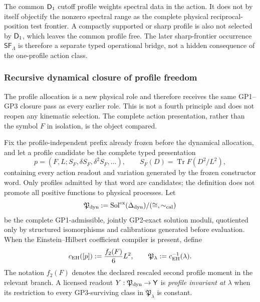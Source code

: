 \documentclass[12pt,a4paper]{article}
\begin{document}
\begin{remark}
\label{p3:rem:action-profile-resolution-frontier}
The common \(\mathsf{D}_1\) cutoff profile weights spectral data in the action.  It
does not by itself objectify the nonzero spectral range as the complete
physical reciprocal-position test frontier.  A compactly supported or sharp
profile is also not selected by \(\mathsf{D}_1\), which leaves the common profile
free.  The later sharp-frontier occurrence \(\mathsf{SF}_\Lambda\) is
therefore a separate typed operational bridge, not a hidden consequence of
the one-profile action class.
\end{remark}

\subsubsection{Recursive dynamical closure of profile freedom}
\label{p3b:sec:dynamical-profile-invariance}

The profile allocation is a new physical role and therefore receives the same
GP1--GP3 closure pass as every earlier role.  This is not a fourth principle
and does not reopen any kinematic selection.  The complete action presentation,
rather than the symbol \(F\) in isolation, is the object compared.

\begin{definition}
\label{p3b:def:exact-dynamical-profile-moduli}
Fix the profile-independent prefix already frozen before the dynamical
allocation, and let a profile candidate be the complete typed presentation
\[
 p=(F,L;S_F,\delta S_F,\delta^2S_F,\ldots),
 \qquad
 S_F(D)=\operatorname{Tr}F(D^2/L^2),
\]
containing every action readout and variation generated by the frozen
constructor word.  Only profiles admitted by that word are candidates; the
definition does not promote all positive functions to physical processes.
Let
\[
 \mathfrak P_{\rm dyn}
 :=\operatorname{Sol}^{\rm ex}(\Delta_{\rm dyn})/
   (\cong,\sim_{\rm cal})
\]
be the complete GP1-admissible, jointly GP2-exact solution moduli, quotiented
only by structured isomorphisms and calibrations generated before evaluation.
When the Einstein--Hilbert coefficient compiler is present, define
\[
 c_{\rm EH}([p])
 :=\frac{f_2(F)}6L^2,
 \qquad
 \mathfrak P_\lambda:=c_{\rm EH}^{-1}(\lambda).
\]
The notation \(f_2(F)\) denotes the declared rescaled second profile moment in
the relevant branch.  A licensed readout
\(Y:\mathfrak P_{\rm dyn}\to\mathsf Y\) is
\emph{profile invariant at \(\lambda\)} when its restriction to every
GP3-surviving class in \(\mathfrak P_\lambda\) is constant.
\end{definition}
\end{document}
